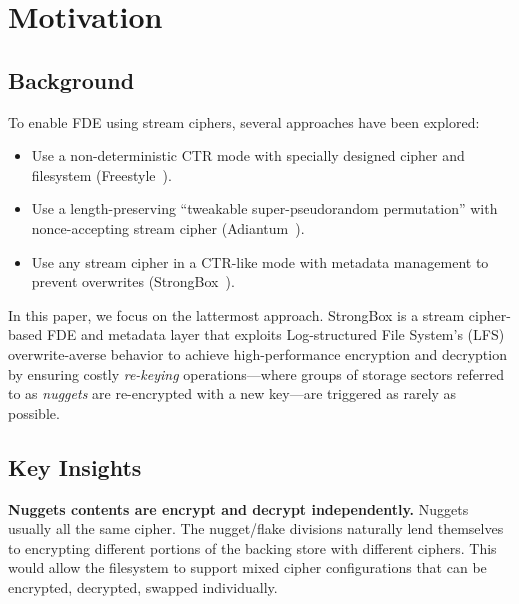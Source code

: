 \section{Motivation}\label{sec:motivation}

\subsection{Background}

 To enable FDE using stream
ciphers, several approaches have been explored:

\begin{itemize}
   \item Use a non-deterministic CTR mode with specially designed cipher and
   filesystem (Freestyle~\cite{Freestyle}).
   \item Use a length-preserving ``tweakable super-pseudorandom permutation''
   with nonce-accepting stream cipher (Adiantum~\cite{Adiantum}).
   \item Use any stream cipher in a CTR-like mode with metadata management to
   prevent overwrites (StrongBox~\cite{StrongBox}).
\end{itemize}

In this paper, we focus on the lattermost approach. StrongBox is a stream
cipher-based FDE and metadata layer that exploits Log-structured File System's
(LFS) overwrite-averse behavior to achieve high-performance encryption and
decryption by ensuring costly \emph{re-keying} operations---where groups of
storage sectors referred to as \emph{nuggets} are re-encrypted with a new
key---are triggered as rarely as possible.


\subsection{Key Insights}

\textbf{Nuggets contents are encrypt and decrypt independently.} Nuggets usually
all the same cipher. The nugget/flake divisions naturally lend themselves to
encrypting different portions of the backing store with different ciphers. This
would allow the filesystem to support mixed cipher configurations that can be
encrypted, decrypted, swapped individually.

